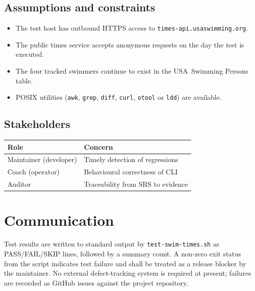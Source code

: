 \documentclass[12pt]{article}
\newcommand{\code}[1]{\texttt{#1}}
\begin{document}
\subsection{Assumptions and constraints}

\begin{itemize}
  \item The test host has outbound HTTPS access to
        \texttt{times-api.usaswimming.org}.
  \item The public times service accepts anonymous requests
        on the day the test is executed.
  \item The four tracked swimmers continue to exist in the
        USA~Swimming Persons table.
  \item POSIX utilities (\code{awk}, \code{grep}, \code{diff},
        \code{curl}, \code{otool} or \code{ldd}) are available.
\end{itemize}

\subsection{Stakeholders}

\begin{center}
\begin{tabular}{ll}
  \toprule
  \textbf{Role}            & \textbf{Concern}                              \\
  \midrule
  Maintainer (developer)   & Timely detection of regressions               \\
  Coach (operator)         & Behavioural correctness of CLI                \\
  Auditor                  & Traceability from SRS to evidence             \\
  \bottomrule
\end{tabular}
\end{center}

\section{Communication}

Test results are written to standard output by
\code{test-swim-times.sh} as PASS/FAIL/SKIP lines, followed by a
summary count.  A non-zero exit status from the script indicates
test failure and shall be treated as a release blocker by the
maintainer.  No external defect-tracking system is required at
present; failures are recorded as GitHub issues against the
project repository.
\end{document}
